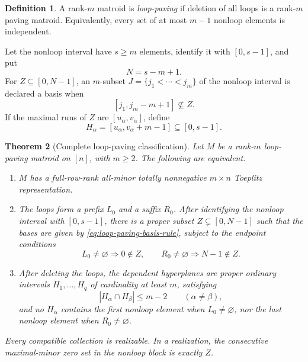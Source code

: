 \documentclass[11pt]{amsart}
\newtheorem{theorem}{Theorem}[section]
\theoremstyle{definition}
\newtheorem{definition}[theorem]{Definition}
\theoremstyle{remark}
\begin{document}
\begin{definition}
A rank-$m$ matroid is \emph{loop-paving} if deletion of all loops is a rank-$m$ paving matroid.  Equivalently, every set of at most $m-1$ nonloop elements is independent.
\end{definition}

Let the nonloop interval have $s\ge m$ elements, identify it with $[0,s-1]$, and put
\[
 N=s-m+1.
\]
For $Z\subseteq[0,N-1]$, an $m$-subset $J=\{j_1<\cdots<j_m\}$ of the nonloop interval is declared a basis when
\begin{equation}\label{eq:loop-paving-basis-rule}
 [j_1,j_m-m+1]\nsubseteq Z.
\end{equation}
If the maximal runs of $Z$ are $[u_\alpha,v_\alpha]$, define
\begin{equation}\label{eq:loop-paving-H}
 H_\alpha=[u_\alpha,v_\alpha+m-1]\subseteq[0,s-1].
\end{equation}

\begin{theorem}[Complete loop-paving classification]\label{thm:loop-paving}
Let $M$ be a rank-$m$ loop-paving matroid on $[n]$, with $m\ge2$.  The following are equivalent.
\begin{enumerate}
\item $M$ has a full-row-rank all-minor totally nonnegative $m\times n$ Toeplitz representation.
\item The loops form a prefix $L_0$ and a suffix $R_0$.  After identifying the nonloop interval with $[0,s-1]$, there is a proper subset $Z\subsetneq[0,N-1]$ such that the bases are given by \eqref{eq:loop-paving-basis-rule}, subject to the endpoint conditions
\begin{equation}\label{eq:protected-Z}
 L_0\ne\varnothing\Longrightarrow 0\notin Z,
 \qquad
 R_0\ne\varnothing\Longrightarrow N-1\notin Z.
\end{equation}
\item After deleting the loops, the dependent hyperplanes are proper ordinary intervals $H_1,\ldots,H_q$ of cardinality at least $m$, satisfying
\begin{equation}\label{eq:loop-paving-overlap}
 |H_\alpha\cap H_\beta|\le m-2\qquad(\alpha\ne\beta),
\end{equation}
and no $H_\alpha$ contains the first nonloop element when $L_0\ne\varnothing$, nor the last nonloop element when $R_0\ne\varnothing$.
\end{enumerate}
Every compatible collection is realizable.  In a realization, the consecutive maximal-minor zero set in the nonloop block is exactly $Z$.
\end{theorem}
\end{document}
